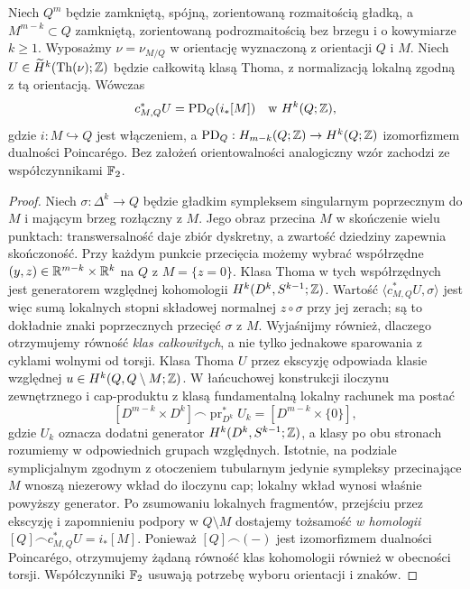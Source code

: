 \begin{twierdzenie}
\label{thm:pt-pd-v9}
Niech $Q^m$ będzie zamkniętą, spójną, zorientowaną
rozmaitością gładką, a $M^{m-k}\subset Q$ zamkniętą,
zorientowaną podrozmaitością bez brzegu i o kowymiarze
$k\ge1$. Wyposażmy $\nu=\nu_{M/Q}$ w orientację
wyznaczoną z orientacji $Q$ i $M$.
Niech $U\in\widetilde H^k(\operatorname{Th}(\nu);\mathbb{Z})$
będzie całkowitą klasą Thoma, z normalizacją lokalną
zgodną z tą orientacją. Wówczas
\[
c_{M,Q}^*U=\operatorname{PD}_Q(i_*[M])
\quad\text{w }H^k(Q;\mathbb{Z}),
\]
gdzie $i:M\hookrightarrow Q$ jest włączeniem, a
$\operatorname{PD}_Q:H_{m-k}(Q;\mathbb{Z})\to H^k(Q;\mathbb{Z})$
izomorfizmem dualności Poincarégo.
Bez założeń orientowalności analogiczny wzór zachodzi
ze współczynnikami $\mathbb{F}_2$.
\end{twierdzenie}
\begin{proof}
Niech $\sigma:\Delta^k\to Q$ będzie gładkim
sympleksem singularnym poprzecznym do $M$ i mającym
brzeg rozłączny z $M$. Jego obraz przecina $M$ w
skończenie wielu punktach: transwersalność daje
zbiór dyskretny, a zwartość dziedziny zapewnia
skończoność. Przy każdym punkcie przecięcia możemy
wybrać współrzędne $(y,z)\in\mathbb{R}^{m-k}\times\mathbb{R}^k$
na $Q$ z $M=\{z=0\}$. Klasa Thoma w tych
współrzędnych jest generatorem względnej kohomologii
$H^k(D^k,S^{k-1};\mathbb{Z})$. Wartość
$\langle c_{M,Q}^*U,\sigma\rangle$ jest więc
sumą lokalnych stopni składowej normalnej
$z\circ\sigma$ przy jej zerach; są to dokładnie
znaki poprzecznych przecięć $\sigma$ z $M$.
Wyjaśnijmy również, dlaczego otrzymujemy równość
\emph{klas całkowitych}, a nie tylko jednakowe
sparowania z cyklami wolnymi od torsji. Klasa Thoma $U$
przez ekscyzję odpowiada klasie względnej
$u\in H^k(Q,Q\setminus M;\mathbb{Z})$. W łańcuchowej
konstrukcji iloczynu zewnętrznego i cap-produktu
z klasą fundamentalną lokalny rachunek ma postać
\[
[D^{m-k}\times D^k]\frown
\operatorname{pr}_{D^k}^*U_k
=[D^{m-k}\times\{0\}],
\]
gdzie $U_k$ oznacza dodatni generator
$H^k(D^k,S^{k-1};\mathbb{Z})$, a klasy po obu stronach
rozumiemy w odpowiednich grupach względnych.
Istotnie, na podziale symplicjalnym zgodnym z
otoczeniem tubularnym jedynie sympleksy przecinające
$M$ wnoszą niezerowy wkład do iloczynu cap;
lokalny wkład wynosi właśnie powyższy generator.
Po zsumowaniu lokalnych fragmentów, przejściu przez
ekscyzję i zapomnieniu podpory w $Q\setminus M$
dostajemy tożsamość \emph{w homologii}
$[Q]\frown c_{M,Q}^*U=i_*[M]$.
Ponieważ $[Q]\frown(-)$ jest izomorfizmem dualności
Poincarégo, otrzymujemy żądaną równość klas
kohomologii również w obecności torsji. Współczynniki
$\mathbb{F}_2$ usuwają potrzebę wyboru orientacji i znaków.
\end{proof}

